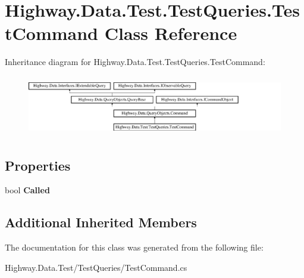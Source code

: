 \hypertarget{class_highway_1_1_data_1_1_test_1_1_test_queries_1_1_test_command}{\section{Highway.\-Data.\-Test.\-Test\-Queries.\-Test\-Command Class Reference}
\label{class_highway_1_1_data_1_1_test_1_1_test_queries_1_1_test_command}
}
Inheritance diagram for Highway.\-Data.\-Test.\-Test\-Queries.\-Test\-Command\-:\begin{figure}[H]
\begin{center}
\leavevmode
\includegraphics[height=2.666667cm]{class_highway_1_1_data_1_1_test_1_1_test_queries_1_1_test_command}
\end{center}
\end{figure}
\subsection*{Properties}
\begin{DoxyCompactItemize}
\item 
\hypertarget{class_highway_1_1_data_1_1_test_1_1_test_queries_1_1_test_command_a7f0b27d20922113037563262888ffa44}{bool {\bfseries Called}}\label{class_highway_1_1_data_1_1_test_1_1_test_queries_1_1_test_command_a7f0b27d20922113037563262888ffa44}

\end{DoxyCompactItemize}
\subsection*{Additional Inherited Members}


The documentation for this class was generated from the following file\-:\begin{DoxyCompactItemize}
\item 
Highway.\-Data.\-Test/\-Test\-Queries/Test\-Command.\-cs\end{DoxyCompactItemize}
